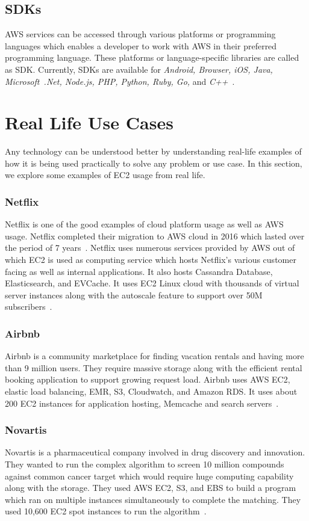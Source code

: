 \subsection{SDKs}
AWS services can be accessed through various platforms or programming
languages which enables a developer to work with AWS in their
preferred programming language. These platforms or language-specific
libraries are called as SDK. Currently, SDKs are available
for \emph{Android, Browser, iOS, Java, Microsoft~.Net, Node.js, PHP, Python,
Ruby, Go,} and \emph{C++}~\cite{hid-sp18-402-www-aws-ec2-sdk}.

\section{Real Life Use Cases}
Any technology can be understood better by understanding real-life
examples of how it is being used practically to solve any problem or
use case. In this section, we explore some examples of EC2 usage from
real life.

\subsubsection{Netflix}
Netflix is one of the good examples of cloud platform usage as well as
AWS usage. Netflix completed their migration to AWS cloud in 2016
which lasted over the period of 7
years~\cite{hid-sp18-402-www-media-netflix}. Netflix uses numerous
services provided by AWS out of which EC2 is used as computing service
which hosts Netflix's various customer facing as well as internal
applications. It also hosts Cassandra Database, Elasticsearch, and
EVCache. It uses EC2 Linux cloud with thousands of virtual server
instances along with the autoscale feature to support over 50M
subscribers~\cite{hid-sp18-402-www-brendangregg}.

\subsubsection{Airbnb}
Airbnb is a community marketplace for finding vacation rentals and
having more than 9 million users. They require massive storage along
with the efficient rental booking application to support growing
request load. Airbnb uses AWS EC2, elastic load balancing, EMR, S3,
Cloudwatch, and Amazon RDS. It uses about 200 EC2 instances for
application hosting, Memcache and search
servers~\cite{hid-sp18-402-www-aws-ec2-airbnb}.

\subsubsection{Novartis}
Novartis is a pharmaceutical company involved in drug discovery and
innovation. They wanted to run the complex algorithm to screen 10
million compounds against common cancer target which would require
huge computing capability along with the storage. They used AWS EC2,
S3, and EBS to build a program which ran on multiple instances
simultaneously to complete the matching. They used 10,600 EC2 spot
instances to run the
algorithm~\cite{hid-sp18-402-www-aws-ec2-novartis}.

